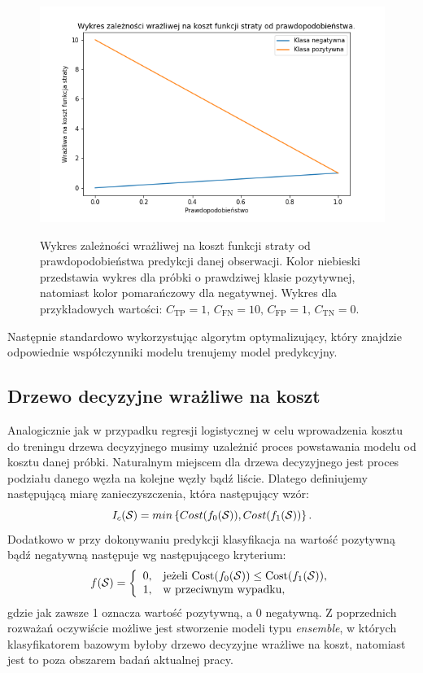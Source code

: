 \documentclass[inzynierska]{pwr_wmat_praca_dyplomowa}
\theoremstyle{plain}
\numberwithin{theorem}{chapter}
\theoremstyle{definition}
\numberwithin{theorem}{chapter}
\begin{document}
\begin{figure}
	\includegraphics[width=\linewidth]{images/cost_sensitive_ce.png}
	\label{cost-sensitive-loss-function}
	\caption{Wykres zależności wrażliwej na koszt funkcji straty od prawdopodobieństwa predykcji danej obserwacji. Kolor niebieski przedstawia wykres dla próbki o prawdziwej klasie pozytywnej, natomiast kolor pomarańczowy dla negatywnej. Wykres dla przykładowych wartości: $C_{\text{TP}} = 1 \text{, } C_{\text{FN}} = 10 \text{, } C_{\text{FP}} = 1 \text{, } C_{\text{TN}} = 0$.}
\end{figure}

Następnie standardowo wykorzystując algorytm optymalizujący, który znajdzie odpowiednie współczynniki modelu trenujemy model predykcyjny.
\subsection{Drzewo decyzyjne wrażliwe na koszt}
Analogicznie jak w przypadku regresji logistycznej w celu wprowadzenia kosztu do treningu drzewa decyzyjnego musimy uzależnić proces powstawania modelu od kosztu danej próbki. Naturalnym miejscem dla drzewa decyzyjnego jest proces podziału danego węzła na kolejne węzły bądź liście. Dlatego definiujemy następującą miarę zanieczyszczenia, która następujący wzór:
$$ I_c(\mathcal{S}) = min \left\{ Cost(f_0(\mathcal{S})), Cost(f_1(\mathcal{S})) \right\} \text{.}$$
Dodatkowo w przy dokonywaniu predykcji klasyfikacja na wartość pozytywną bądź negatywną następuje wg następującego kryterium:
$$ f(\mathcal{S}) =  \left\{
\begin{array}{rl}
0, &\mbox{jeżeli $\text{Cost}(f_0(\mathcal{S})) \leq \text{Cost}(f_1(\mathcal{S}))$}, \\
1, &\mbox{w przeciwnym wypadku},
\end{array}{}
\right.
$$
gdzie jak zawsze 1 oznacza wartość pozytywną, a 0 negatywną. 
Z poprzednich rozważań oczywiście możliwe jest stworzenie modeli typu \textit{ensemble}, w których klasyfikatorem bazowym byłoby drzewo decyzyjne wrażliwe na koszt, natomiast jest to poza obszarem badań aktualnej pracy.
\end{document}
